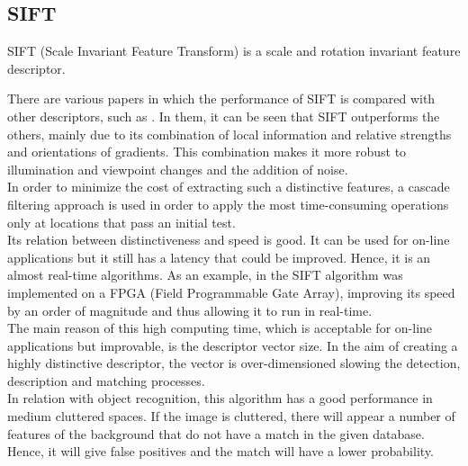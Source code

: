 \subsection{SIFT}

SIFT (Scale Invariant Feature Transform) is a scale and rotation invariant feature descriptor\cite{sift}. 

There are various papers in which the performance of SIFT is compared with other descriptors, such as \cite{Mikolajczyk2005}. In them, it can be seen that SIFT outperforms the others, mainly due to its combination of local information and relative strengths and orientations of gradients. This combination makes it more robust to illumination and viewpoint changes and the addition of noise. 
\\

In order to minimize the cost of extracting such a distinctive features, a cascade filtering approach is used in order to apply the most time-consuming operations only at locations that pass an initial test. 
\\

Its relation between distinctiveness and speed is good. It can be used for on-line applications but it still has a latency that could be improved. Hence, it is an almost real-time algorithms. As an example, in \cite{sift_fpga} the SIFT algorithm was implemented on a FPGA (Field Programmable Gate Array), improving its speed by an order of magnitude and thus allowing it to run in real-time.
\\

The main reason of this high computing time, which is acceptable for on-line applications but improvable, is the descriptor vector size. In the aim of creating a highly distinctive descriptor, the vector is over-dimensioned slowing the detection, description and matching processes. 
\\

In relation with object recognition, this algorithm has a good performance in medium cluttered spaces. If the image is cluttered, there will appear a number of features of the background that do not have a match in the given database. Hence, it will give false positives and the match will have a lower probability. 

